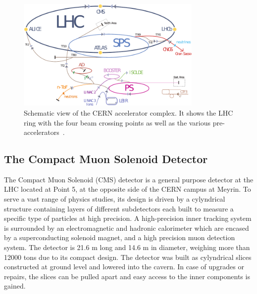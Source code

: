 \begin{figure}[htb]
    \centering
    \includegraphics[width=0.8\textwidth]{figures/cms_detector/lhc_accelerator_chain.pdf}
    \caption[CERN accelerator complex]{Schematic view of the CERN
        accelerator complex. It shows the LHC ring  with the four beam crossing
        points as well as the various pre-accelerators~\cite{LHC:COMPLEX}.}
    \label{fig:lhc_complex}
\end{figure}

\subsection{The Compact Muon Solenoid Detector}

The Compact Muon Solenoid (CMS) detector is a general purpose detector at the
LHC located at Point 5, at the opposite side of the CERN campus at Meyrin. To
serve a vast range of physics studies, its design is driven by a cylyndrical
structure containing layers of different subdetectors each built
to measure a specific type of particles at high precision. A high-precision
inner tracking system is surrounded by an electromagnetic and hadronic
calorimeter which are encased by a superconducting solenoid magnet, and a high
precision muon detection system. The detector is 21.6 m long and 14.6 m in
diameter, weighing more than 12000 tons due to its compact design. The detector
was built as cylyndrical slices constructed at ground level and lowered into the
cavern. In case of upgrades or repairs, the slices can be pulled apart and easy
access to the inner components is gained. 

